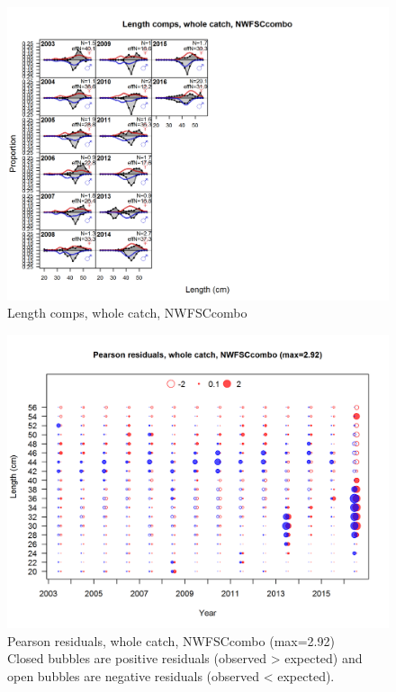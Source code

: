 \documentclass[12pt,]{article}
\begin{document}
\begin{figure}[htbp]
\centering
\includegraphics{./r4ss/plots_mod1/comp_lenfit_flt6mkt0.png}
\caption{Length comps, whole catch, NWFSCcombo
\label{fig:mod1_26_comp_lenfit_flt6mkt0}}
\end{figure}

\begin{figure}[htbp]
\centering
\includegraphics{./r4ss/plots_mod1/comp_lenfit_residsflt6mkt0.png}
\caption{Pearson residuals, whole catch, NWFSCcombo (max=2.92)\\
Closed bubbles are positive residuals (observed \textgreater{} expected)
and open bubbles are negative residuals (observed \textless{} expected).
\label{fig:mod1_27_comp_lenfit_residsflt6mkt0}}
\end{figure}
\end{document}
